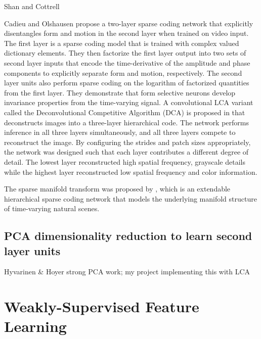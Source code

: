Shan and Cottrell \citeyearpar{shan2013efficient} 

Cadieu and Olshausen \citeyearpar{cadieu2008learning} propose a two-layer sparse coding network that explicitly disentangles form and motion in the second layer when trained on video input. The first layer is a sparse coding model that is trained with complex valued dictionary elements. They then factorize the first layer output into two sets of second layer inputs that encode the time-derivative of the amplitude and phase components to explicitly separate form and motion, respectively. The second layer units also perform sparse coding on the logarithm of factorized quantities from the first layer. They demonstrate that form selective neurons develop invariance properties from the time-varying signal. A convolutional LCA variant called the Deconvolutional Competitive Algorithm (DCA) is proposed in \parencite{paiton2015deconvolutional} that deconstructs images into a three-layer hierarchical code. The network performs inference in all three layers simultaneously, and all three layers compete to reconstruct the image. By configuring the strides and patch sizes appropriately, the network was designed such that each layer contributes a different degree of detail. The lowest layer reconstructed high spatial frequency, grayscale details while the highest layer reconstructed low spatial frequency and color information.

The sparse manifold transform was proposed by \parencite{chen2018sparse}, which is an extendable hierarchical sparse coding network that models the underlying manifold structure of time-varying natural scenes. 

\subsection{PCA dimensionality reduction to learn second layer units}
Hyvarinen & Hoyer strong PCA work; my project implementing this with LCA


\section{Weakly-Supervised Feature Learning}

